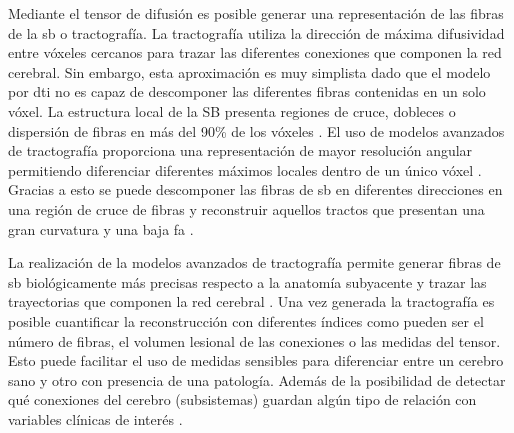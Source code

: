 Mediante el tensor de difusión es posible generar una representación de las fibras de la \gls{sb} o tractografía. La tractografía utiliza la dirección de máxima difusividad entre vóxeles cercanos para trazar las diferentes conexiones que componen la red cerebral. Sin embargo, esta aproximación es muy simplista dado que el modelo por \gls{dti} no es capaz de descomponer las diferentes fibras contenidas en un solo vóxel. La estructura local de la SB presenta regiones de cruce, dobleces o dispersión de fibras en más del 90\% de los vóxeles \cite{Jeurissen2013InvestigatingImaging}. El uso de modelos avanzados de tractografía proporciona una representación de mayor resolución angular permitiendo diferenciar  diferentes máximos locales dentro de un único vóxel \cite{Tuch2002HighHeterogeneity}. Gracias a esto se puede descomponer las fibras de \gls{sb} en diferentes direcciones en una región de cruce de fibras y reconstruir aquellos tractos que presentan una gran curvatura y una baja \gls{fa} \cite{Martinez-Heras2015ImprovedRadiation}.  

La realización de la modelos avanzados de tractografía permite generar fibras de \gls{sb} biológicamente más precisas respecto a la anatomía subyacente y trazar las trayectorias que componen la red cerebral \cite{Rubinov2010ComplexInterpretations}. Una vez generada la  tractografía es posible cuantificar la reconstrucción con diferentes índices como pueden ser el número de fibras, el volumen lesional de las conexiones o las medidas del tensor. Esto puede facilitar el uso de medidas sensibles para diferenciar entre un cerebro sano y otro con presencia de una patología. Además de la posibilidad de detectar qué conexiones del cerebro (subsistemas) guardan algún tipo de relación con variables clínicas de interés \cite{Llufriu2017StructuralSclerosis}. 

